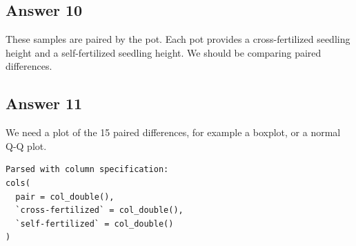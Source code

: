 \documentclass[
]{book}
\newenvironment{Shaded}{\begin{snugshade}}{\end{snugshade}}
\newcommand{\KeywordTok}[1]{\textcolor[rgb]{0.13,0.29,0.53}{\textbf{#1}}}
\newcommand{\NormalTok}[1]{#1}
\newcommand{\OperatorTok}[1]{\textcolor[rgb]{0.81,0.36,0.00}{\textbf{#1}}}
\newcommand{\StringTok}[1]{\textcolor[rgb]{0.31,0.60,0.02}{#1}}
\begin{document}
\hypertarget{answer-10}{%
\subsection{Answer 10}\label{answer-10}}

These samples are paired by the pot. Each pot provides a cross-fertilized seedling height and a self-fertilized seedling height. We should be comparing paired differences.

\hypertarget{answer-11}{%
\subsection{Answer 11}\label{answer-11}}

We need a plot of the 15 paired differences, for example a boxplot, or a normal Q-Q plot.

\begin{Shaded}
\end{Shaded}

\begin{verbatim}
Parsed with column specification:
cols(
  pair = col_double(),
  `cross-fertilized` = col_double(),
  `self-fertilized` = col_double()
)
\end{verbatim}
\end{document}
